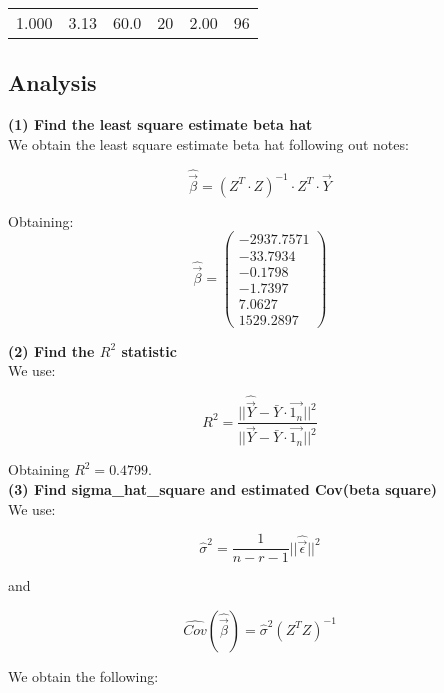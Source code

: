\documentclass[11pt,a4paper]{article}
\begin{document}
\begin{table}[H]
\begin{tabular}{cccccc}
			1.000                                                         & 3.13                                                             & 60.0                                                                                           & 20                                                          & 2.00                                                                           & 96                                                          
		\end{tabular}
	\end{table}
	
	\subsection{Analysis}
	
	\textbf{(1) Find the least square estimate beta hat} \\
	
	We obtain the least square estimate beta hat following out notes:
	
	$$ \hat{\vec{\beta}} = (Z^T \cdot Z)^{-1} \cdot Z^T \cdot \vec{Y} $$
	
	Obtaining:
	$$ \hat{\vec{\beta}} =
		\begin{pmatrix}
		-2937.7571 \\
		-33.7934   \\
		-0.1798   \\
		-1.7397    \\
		7.0627     \\
		1529.2897
		\end{pmatrix}
	$$
	
	\textbf{(2) Find the $R^2$ statistic} \\
	
	We use:
	
	$$ R^2 = \frac{||\hat{\vec{Y}} - \bar{Y} \cdot \vec{1_n}||^2}{||\vec{Y} - \bar{Y} \cdot \vec{1_n}||^2} $$
	
	Obtaining $R^2 = 0.4799$. \\
	
	\textbf{(3) Find sigma\_hat\_square and estimated Cov(beta square)} \\
	
	We use:
	
	$$ \hat{\sigma}^2 = \frac{1}{n-r-1} ||\hat{\vec{\epsilon}}||^2 $$
	
	and
	
	$$ \hat{Cov}(\hat{\vec{\beta}}) = \hat{\sigma}^2 (Z^T Z)^{-1} $$
	
	We obtain the following:
	
\end{document}
